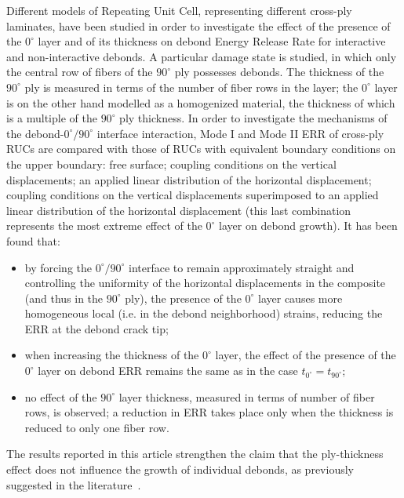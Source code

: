 Different models of Repeating Unit Cell, representing different cross-ply laminates, have been studied in order to investigate the effect of the presence of the $0^{\circ}$ layer and of its thickness on debond Energy Release Rate for interactive and non-interactive debonds. A particular damage state is studied, in which only the central row of fibers of the $90^{\circ}$ ply possesses debonds. The thickness of the $90^{\circ}$ ply is measured in terms of the number of fiber rows in the layer; the $0^{\circ}$ layer is on the other hand modelled as a homogenized material, the thickness of which is a multiple of the $90^{\circ}$ ply thickness. In order to investigate the mechanisms of the debond-$0^{\circ}/90^{\circ}$ interface interaction, Mode I and Mode II ERR of cross-ply RUCs are compared with those of RUCs with equivalent boundary conditions on the upper boundary: free surface; coupling conditions on the vertical displacements; an applied linear distribution of the horizontal displacement; coupling conditions on the vertical displacements superimposed to an applied linear distribution of the horizontal displacement (this last combination represents the most extreme effect of the $0^{\circ}$ layer on debond growth). It has been found that:
\begin{itemize}
\item by forcing the $0^{\circ}/90^{\circ}$ interface to remain approximately straight and controlling the uniformity of the horizontal displacements in the composite (and thus in the $90^{\circ}$ ply), the presence of the $0^{\circ}$ layer causes more homogeneous local (i.e. in the debond neighborhood) strains, reducing the ERR at the debond crack tip;
\item when increasing the thickness of the $0^{\circ}$ layer, the effect of the presence of the $0^{\circ}$ layer on debond ERR remains the same as in the case $t_{0^{\circ}}=t_{90^{\circ}}$;
\item no effect of the $90^{\circ}$ layer thickness, measured in terms of number of fiber rows, is observed; a reduction in ERR takes place only when the thickness is reduced to only one fiber row.
\end{itemize}
The results reported in this article strengthen the claim that the ply-thickness effect does not influence the growth of individual debonds, as previously suggested in the literature~\cite{Saito2012,Herraez2015,Velasco2018, Paris2018}.

